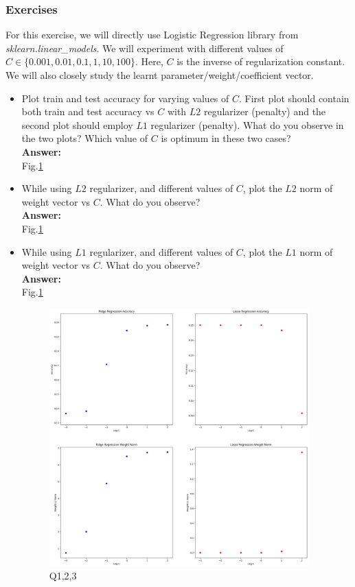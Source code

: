 \documentclass{article}
\begin{document}
\subsubsection*{Exercises}

For this exercise, we will directly use Logistic Regression library from \textit{sklearn.linear\_models}. We will experiment with different values of $C \in \{0.001,0.01,0.1,1,10,100\}$. Here, $C$ is the inverse of regularization constant. We will also closely study the learnt parameter/weight/coefficient vector.
\begin{itemize}
	\item Plot train and test accuracy for varying values of $C$. First plot should contain both train and test accuracy vs $C$ with $L2$ regularizer (penalty) and the second plot should employ $L1$ regularizer (penalty). What do you observe in the two plots? Which value of $C$ is optimum in these two cases?
	\\\textbf{Answer:}\\
	Fig.\ref{fig:q123}
	
	\item While using $L2$ regularizer, and different values of $C$, plot the $L2$ norm of weight vector vs $C$. What do you observe?
	\\\textbf{Answer:}\\
	Fig.\ref{fig:q123}
	
	\item While using $L1$ regularizer, and different values of $C$, plot the $L1$ norm of weight vector vs $C$. What do you observe?
	\\\textbf{Answer:}\\
	Fig.\ref{fig:q123}
	
	\begin{figure}[!h]
		\centering
		\includegraphics[width=10cm]{./Python/result1.png}
		\caption{Q1,2,3}
		\label{fig:q123}
	\end{figure}
	

\end{itemize}
\end{document}
